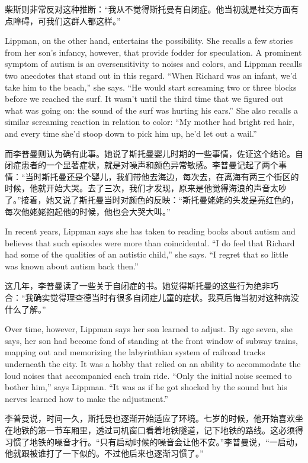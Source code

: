 \ifdefined\chs
柴斯则非常反对这种推断：``我从不觉得斯托曼有自闭症。他当初就是社交方面有点障碍，可我们这群人都这样。''
\fi

\ifdefined\eng
Lippman, on the other hand, entertains the possibility. She recalls a few stories from her son's infancy, however, that provide fodder for speculation. A prominent symptom of autism is an oversensitivity to noises and colors, and Lippman recalls two anecdotes that stand out in this regard. ``When Richard was an infant, we'd take him to the beach,'' she says. ``He would start screaming two or three blocks before we reached the surf. It wasn't until the third time that we figured out what was going on: the sound of the surf was hurting his ears.'' She also recalls a similar screaming reaction in relation to color: ``My mother had bright red hair, and every time she'd stoop down to pick him up, he'd let out a wail.''
\fi

\ifdefined\chs
而李普曼则认为确有此事。她说了斯托曼婴儿时期的一些事情，佐证这个结论。自闭症患者的一个显著症状，就是对噪声和颜色异常敏感。李普曼记起了两个事情：``当时斯托曼还是个婴儿，我们带他去海边，每次去，在离海有两三个街区的时候，他就开始大哭。去了三次，我们才发现，原来是他觉得海浪的声音太吵了。''接着，她又说了斯托曼当时对颜色的反映：``斯托曼姥姥的头发是亮红色的，每次他姥姥抱起他的时候，他也会大哭大叫。''
\fi

\ifdefined\eng
In recent years, Lippman says she has taken to reading books about autism and believes that such episodes were more than coincidental. ``I do feel that Richard had some of the qualities of an autistic child,'' she says. ``I regret that so little was known about autism back then.''
\fi

\ifdefined\chs
这几年，李普曼读了一些关于自闭症的书。她觉得斯托曼的这些行为绝非巧合：``我确实觉得理查德当时有很多自闭症儿童的症状。我真后悔当初对这种病没什么了解。''
\fi

\ifdefined\eng
Over time, however, Lippman says her son learned to adjust. By age seven, she says, her son had become fond of standing at the front window of subway trains, mapping out and memorizing the labyrinthian system of railroad tracks underneath the city. It was a hobby that relied on an ability to accommodate the loud noises that accompanied each train ride. ``Only the initial noise seemed to bother him,'' says Lippman. ``It was as if he got shocked by the sound but his nerves learned how to make the adjustment.''
\fi

\ifdefined\chs
李普曼说，时间一久，斯托曼也逐渐开始适应了环境。七岁的时候，他开始喜欢坐在地铁的第一节车厢里，透过司机窗口看着地铁隧道，记下地铁的路线。这必须得习惯了地铁的噪音才行。``只有启动时候的噪音会让他不安。''李普曼说，``一启动，他就跟被谁打了一下似的。不过他后来也逐渐习惯了。''
\fi

